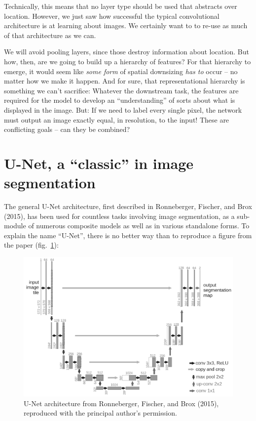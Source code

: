\documentclass[
  letterpaper,
]{krantz}
\begin{document}
Technically, this means that no layer type should be used that abstracts
over location. However, we just saw how successful the typical
convolutional architecture is at learning about images. We certainly
want to to re-use as much of that architecture as we can.

We will avoid pooling layers, since those destroy information about
location. But how, then, are we going to build up a hierarchy of
features? For that hierarchy to emerge, it would seem like \emph{some
form} of spatial downsizing \emph{has to} occur -- no matter how we make
it happen. And for sure, that representational hierarchy is something we
can't sacrifice: Whatever the downstream task, the features are required
for the model to develop an ``understanding'' of sorts about what is
displayed in the image. But: If we need to label every single pixel, the
network must output an image exactly equal, in resolution, to the input!
These are conflicting goals -- can they be combined?

\hypertarget{u-net-a-classic-in-image-segmentation}{%
\section{U-Net, a ``classic'' in image
segmentation}\label{u-net-a-classic-in-image-segmentation}}

The general U-Net architecture, first described in Ronneberger, Fischer,
and Brox (2015), has been used for countless tasks involving image
segmentation, as a sub-module of numerous composite models as well as in
various standalone forms. To explain the name ``U-Net'', there is no
better way than to reproduce a figure from the paper
(fig.~\ref{fig-segmentation-unet}):

\begin{figure}[H]

{\centering \includegraphics{images/segmentation-unet.png}

}

\caption{\label{fig-segmentation-unet}U-Net architecture from
Ronneberger, Fischer, and Brox (2015), reproduced with the principal
author's permission.}

\end{figure}
\end{document}
